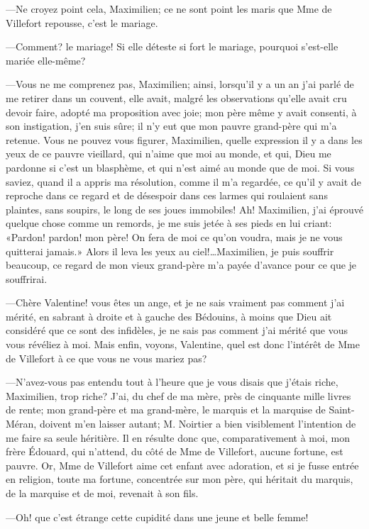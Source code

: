 —Ne croyez point cela, Maximilien; ce ne sont point les maris que Mme de Villefort repousse, c'est le mariage. 

—Comment? le mariage! Si elle déteste si fort le mariage, pourquoi s'est-elle mariée elle-même? 

—Vous ne me comprenez pas, Maximilien; ainsi, lorsqu'il y a un an j'ai parlé de me retirer dans un couvent, elle avait, malgré les observations qu'elle avait cru devoir faire, adopté ma proposition avec joie; mon père même y avait consenti, à son instigation, j'en suis sûre; il n'y eut que mon pauvre grand-père qui m'a retenue. Vous ne pouvez vous figurer, Maximilien, quelle expression il y a dans les yeux de ce pauvre vieillard, qui n'aime que moi au monde, et qui, Dieu me pardonne si c'est un blasphème, et qui n'est aimé au monde que de moi. Si vous saviez, quand il a appris ma résolution, comme il m'a regardée, ce qu'il y avait de reproche dans ce regard et de désespoir dans ces larmes qui roulaient sans plaintes, sans soupirs, le long de ses joues immobiles! Ah! Maximilien, j'ai éprouvé quelque chose comme un remords, je me suis jetée à ses pieds en lui criant: «Pardon! pardon! mon père! On fera de moi ce qu'on voudra, mais je ne vous quitterai jamais.» Alors il leva les yeux au ciel!\dots Maximilien, je puis souffrir beaucoup, ce regard de mon vieux grand-père m'a payée d'avance pour ce que je souffrirai. 

—Chère Valentine! vous êtes un ange, et je ne sais vraiment pas comment j'ai mérité, en sabrant à droite et à gauche des Bédouins, à moins que Dieu ait considéré que ce sont des infidèles, je ne sais pas comment j'ai mérité que vous vous révéliez à moi. Mais enfin, voyons, Valentine, quel est donc l'intérêt de Mme de Villefort à ce que vous ne vous mariez pas? 

—N'avez-vous pas entendu tout à l'heure que je vous disais que j'étais riche, Maximilien, trop riche? J'ai, du chef de ma mère, près de cinquante mille livres de rente; mon grand-père et ma grand-mère, le marquis et la marquise de Saint-Méran, doivent m'en laisser autant; M. Noirtier a bien visiblement l'intention de me faire sa seule héritière. Il en résulte donc que, comparativement à moi, mon frère Édouard, qui n'attend, du côté de Mme de Villefort, aucune fortune, est pauvre. Or, Mme de Villefort aime cet enfant avec adoration, et si je fusse entrée en religion, toute ma fortune, concentrée sur mon père, qui héritait du marquis, de la marquise et de moi, revenait à son fils. 

—Oh! que c'est étrange cette cupidité dans une jeune et belle femme! 

